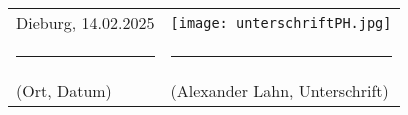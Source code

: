 \begin{tabular}{m{7cm} m{7cm}}
    \vspace{1.3cm}Dieburg, 14.02.2025 & \vspace{0.2cm}\texttt{[image: unterschriftPH.jpg]} \\
    \multicolumn{1}{c}{\hspace{-2cm}\rule{5cm}{0.4pt}} & \multicolumn{1}{c}{\hspace{-2cm}\rule{5cm}{0.4pt}} \\
    (Ort, Datum) & (Alexander Lahn, Unterschrift) \\
\end{tabular}
